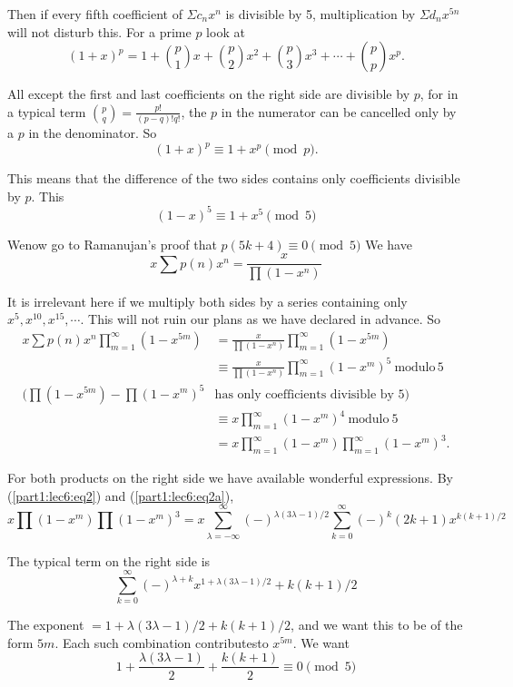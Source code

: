 Then if every fifth coefficient of $\Sigma c_n x^n$ is divisible by 5,
multiplication by $\Sigma d_n x^{5n}$ will not disturb this. For a
prime $p$ look at
$$
(1+x)^p= 1+ \binom{p}{1} x + \binom{p}{2} x^2 + \binom{p}{3} x^3 +
\cdots + \binom{p}{p} x^p.
$$

All except the first and last coefficients on the right side are
divisible by $p$, for in a typical term $\binom{p}{q} =
\frac{p!}{(p-q)! q!}$, the $p$ in the numerator can be cancelled only
by a $p$ in the denominator. So
$$
(1+x)^p \equiv 1+x^p \pmod{p}.
$$

This means that the difference of the two sides contains only
coefficients divisible by $p$. This
$$
(1-x)^5 \equiv 1+x^5 \pmod{5}
$$

We\pageoriginale  now go to Ramanujan's proof that $p(5k+4) \equiv 0 \pmod{5}$ We
have
$$
x \sum p(n) x^n = \frac{x}{\prod (1-x^n)}
$$

It is irrelevant here if we multiply both sides by a series containing
only $x^5, x^{10}, x^{15}, \cdots$. This will not ruin our plans as we
have declared in advance. So
\begin{align*}
  x \sum p(n) x^n \prod^\infty_{m=1} (1-x^{5m}) &
  =\frac{x}{\prod(1-x^n)} \prod^\infty_{m=1} (1-x^{5m})\\
  & \equiv \frac{x}{\prod (1-x^n)} \prod^\infty_{m=1} (1-x^m)^5
  ~\text{modulo}\, 5\\  
  \Big(\prod (1-x^{5m}) -\prod (1-x^m)^5 
  & \text{has only coefficients divisible by 5}\Big)\\
  & \equiv x \prod^\infty_{m=1} (1-x^m)^4 ~\text{modulo}~ 5\\
  & = x \prod^\infty_{m=1} (1-x^m) \prod^\infty_{m=1} (1-x^m)^3.
\end{align*}

For both products on the right side we have available wonderful
expressions. By (\ref{part1:lec6:eq2}) and (\ref{part1:lec6:eq2a}),
$$
x \prod (1-x^m) \prod (1-x^m)^3 = x \sum^\infty_{\lambda=-\infty}
(-)^{\lambda (3 \lambda -1)/2} \sum^\infty_{k=0} (-)^k (2k+1) x^{k(k+1)/2}
$$

The typical term on the right side is 
$$
\sum^\infty_{k=0} (-)^{\lambda+k} x^{1+\lambda(3 \lambda-1)/2} + k(k+1)/2
$$

The exponent $= 1+ \lambda (3 \lambda-1)/2+ k(k+1)/2$, and we want
this to be of the form $5m$. Each such combination
contributes\pageoriginale  to $x^{5m}$. We want
$$
1+ \frac{\lambda(3 \lambda-1)}{2} + \frac{k(k+1)}{2} \equiv 0 \pmod{5}
$$

